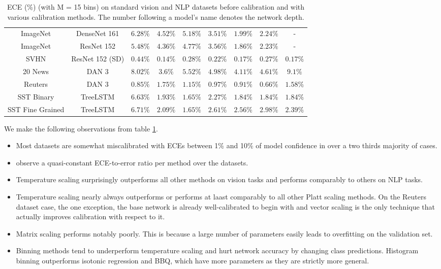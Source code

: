 \begin{table}
{\begin{tabular}{ *{9}{c} }
      ImageNet & DenseNet 161 & $6.28\%$ & $4.52\%$ & $5.18\%$ & $3.51\%$ & $1.99\%$ & $2.24\%$ & - \\
      ImageNet & ResNet 152 & $5.48\%$ & $4.36\%$ & $4.77\%$ & $3.56\%$ & $1.86\%$ & $2.23\%$ & - \\
      SVHN & ResNet 152 (SD) & $0.44\%$ & $0.14\%$ & $0.28\%$ & $0.22\%$ & $0.17\%$ & $0.27\%$ & $0.17\%$ \\
      \hline
	  20 News & DAN 3 & $8.02\%$ & $3.6\%$ & $5.52\%$ & $4.98\%$ & $4.11\%$ & $4.61\%$ & $9.1\%$ \\
      Reuters & DAN 3 & $0.85\%$ & $1.75\%$ & $1.15\%$ & $0.97\%$ & $0.91\%$ & $0.66\%$ & $1.58\%$ \\
      SST Binary & TreeLSTM & $6.63\%$ & $1.93\%$ & $1.65\%$ & $2.27\%$ & $1.84\%$ & $1.84\%$ & $1.84\%$ \\
      SST Fine Grained & TreeLSTM & $6.71\%$ & $2.09\%$ & $1.65\%$ & $2.61\%$ & $2.56\%$ & $2.98\%$ & $2.39\%$ \\
      \hline
    \end{tabular}
  }
  \caption{
    ECE (\%) (with M = 15 bins) on standard vision and NLP datasets before calibration and with various calibration methods. The number following a model’s name denotes the network depth.
  }
  \label{comparison_calibration_methods}
\end{table}

We make the following observations from table \ref{comparison_calibration_methods}.
\begin{itemize}
  \item Most datasets are somewhat miscalibrated with ECEs between 1\% and 10\% of model confidence in over a two thirds majority of cases.
  \item \cite{guo2017calibration} observe a quasi-constant ECE-to-error ratio per method over the datasets.
  \item Temperature scaling surprisingly outperforms all other methods on vision tasks and performs comparably to others on NLP tasks.
  \item Temperature scaling nearly always outperforms or performs at laast comparably to all other Platt scaling methods. On the Reuters dataset case, the one exception, the base network is already well-calibrated to begin with and vector scaling is the only technique that actually improves calibration with respect to it.
  \item Matrix scaling performs notably poorly. This is because a large number of parameters easily leads to overfitting on the validation set.
  \item Binning methods tend to underperform temperature scaling and hurt network accuracy by changing class predictions. Histogram binning outperforms isotonic regression and BBQ, which have more parameters as they are strictly more general.
\end{itemize}

